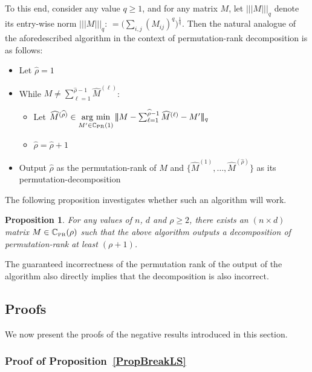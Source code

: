 \documentclass[11pt, hidelinks]{article} %
\newtheorem{proposition}{Proposition}
\newcommand{\matsnorm}[2]{|\!|\!| #1 | \! | \!|_{{#2}}}
\newcommand{\defn}{\ensuremath{:\,=}}
\newcommand{\argmin}{\operatornamewithlimits{arg~min}}
\newcommand{\numrows}{n}
\newcommand{\numcols}{d}
\newcommand{\wtmatrix}{M}
\newcommand{\wt}{\wtmatrix}
\newcommand{\matrixset}{\mathbb{C}}
\newcommand{\wthat}{\widehat{\wtmatrix}}
\newcommand{\permset}{\matrixset_{\mbox{\tiny PR}}}
\newcommand{\permrank}{\rho}
\newcommand{\entrynorm}{q}
\begin{document}
To this end, consider any value $\entrynorm \geq 1$, and for any
matrix $\wt$, let $\matsnorm{\wt}{\entrynorm}$ denote its entry-wise
norm $\matsnorm{\wt}{\entrynorm} \defn \big(\sum_{i,j}
(\wt_{ij})^\entrynorm \big)^{\frac{1}{\entrynorm}}$. Then the natural
analogue of the aforedescribed algorithm in the context of
permutation-rank decomposition is as follows:
\begin{itemize}
\item Let $\widehat{\permrank} = 1$
\item While $\wt \neq \sum_{\ell=1}^{\widehat{\permrank} - 1} \wthat^{(\ell)}$:
  \begin{itemize}
  \item Let $\wthat^{(\widehat{\permrank})} \in \argmin \limits_{\wt' \in \permset(1)} \matsnorm{ \wt - \sum_{\ell=1}^{\widehat{\permrank} - 1} \wthat^{(\ell)} - \wt'}{\entrynorm}$
  \item $\widehat{\permrank} = \widehat{\permrank} + 1$
  \end{itemize}
\item Output $\widehat{\permrank}$ as the permutation-rank of $\wt$
  and $\{\wthat^{(1)}, \ldots, \wthat^{(\widehat{\permrank})} \}$ as its
  permutation-decomposition
\end{itemize}

The following proposition investigates whether such an algorithm will work.
\begin{proposition}\label{PropBreakGreedyDecomp}
For any values of $\numrows$, $\numcols$ and $\permrank \geq 2$,
there exists an $(\numrows \times \numcols)$ matrix $\wt \in
\permset(\permrank)$ such that the above algorithm outputs a
decomposition of permutation-rank at least $(\permrank + 1)$.
\end{proposition}

The guaranteed incorrectness of the permutation rank of the output of
the algorithm also directly implies that the decomposition is also
incorrect.


\subsection{Proofs}

We now present the proofs of the negative results introduced in this
section.


\subsubsection{Proof of Proposition~\ref{PropBreakLS}}
\label{AppProofPropBreakLS}
\end{document}
